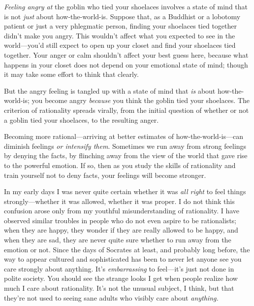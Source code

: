 {
 \textit{Feeling angry at} the goblin who tied your shoelaces
involves a state of mind that is not \textit{just} about
how-the-world-is. Suppose that, as a Buddhist or a lobotomy patient or
just a very phlegmatic person, finding your shoelaces tied together
didn't make you angry. This wouldn't
affect what you expected to see in the world---you'd
still expect to open up your closet and find your shoelaces tied
together. Your anger or calm shouldn't affect your best
guess here, because what happens in your closet does not depend on your
emotional state of mind; though it may take some effort to think that
clearly.}

{
 But the angry feeling is tangled up with a state of mind that
\textit{is} about how-the-world-is; you become angry \textit{because}
you think the goblin tied your shoelaces. The criterion of rationality
spreads virally, from the initial question of whether or not a goblin
tied your shoelaces, to the resulting anger.}

{
 Becoming more rational---arriving at better estimates of
how-the-world-is---can diminish feelings \textit{or intensify them}.
Sometimes we run away from strong feelings by denying the facts, by
flinching away from the view of the world that gave rise to the
powerful emotion. If so, then as you study the skills of rationality
and train yourself not to deny facts, your feelings will become
stronger.}

{
 In my early days I was never quite certain whether it was
\textit{all right} to feel things strongly---whether it was allowed,
whether it was proper. I do not think this confusion arose only from my
youthful misunderstanding of rationality. I have observed similar
troubles in people who do not even aspire to be rationalists; when they
are happy, they wonder if they are really allowed to be happy, and when
they are sad, they are never quite sure whether to run away from the
emotion or not. Since the days of Socrates at least, and probably long
before, the way to appear cultured and sophisticated has been to never
let anyone see you care strongly about anything. It's
\textit{embarrassing} to feel---it's just not done in
polite society. You should see the strange looks I get when people
realize how much I care about rationality. It's not the
unusual subject, I think, but that they're not used to
seeing sane adults who visibly care about \textit{anything.}}

